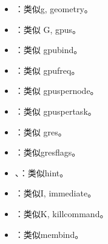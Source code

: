 \documentclass[a4paper,12pt,english]{sphinxmanual}
\begin{document}
\begin{itemize}
\item {} 
\sphinxAtStartPar
{}：类似\sphinxhyphen{}g, \sphinxhyphen{}\sphinxhyphen{}geometry。

\item {} 
\sphinxAtStartPar
{}：类似 \sphinxhyphen{}G, \sphinxhyphen{}\sphinxhyphen{}gpus。

\item {} 
\sphinxAtStartPar
{}：类似 \sphinxhyphen{}\sphinxhyphen{}gpu\sphinxhyphen{}bind。

\item {} 
\sphinxAtStartPar
{}：类似 \sphinxhyphen{}\sphinxhyphen{}gpu\sphinxhyphen{}freq。

\item {} 
\sphinxAtStartPar
{}：类似 \sphinxhyphen{}\sphinxhyphen{}gpus\sphinxhyphen{}per\sphinxhyphen{}node。

\item {} 
\sphinxAtStartPar
{}：类似 \sphinxhyphen{}\sphinxhyphen{}gpus\sphinxhyphen{}per\sphinxhyphen{}task。

\item {} 
\sphinxAtStartPar
{}：类似 \sphinxhyphen{}\sphinxhyphen{}gres。

\item {} 
\sphinxAtStartPar
{}：类似\sphinxhyphen{}\sphinxhyphen{}gres\sphinxhyphen{}flags。

\item {} 
\sphinxAtStartPar
{}、：类似\sphinxhyphen{}\sphinxhyphen{}hint。

\item {} 
\sphinxAtStartPar
{}：类似\sphinxhyphen{}I, \sphinxhyphen{}\sphinxhyphen{}immediate。

\item {} 
\sphinxAtStartPar
{}：类似\sphinxhyphen{}K, \sphinxhyphen{}\sphinxhyphen{}kill\sphinxhyphen{}command。

\item {} 
\sphinxAtStartPar
{}：类似\sphinxhyphen{}\sphinxhyphen{}mem\sphinxhyphen{}bind。


\end{itemize}
\end{document}
